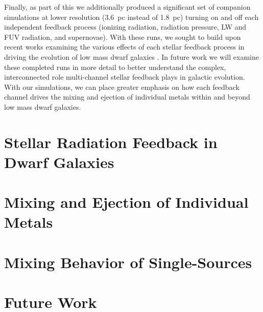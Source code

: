 Finally, as part of this \dissertation we additionally produced a significant set of companion simulations at lower resolution (3.6~pc instead of 1.8~pc) turning on and off each independent feedback process (ionizing radiation, radiation pressure, LW and FUV radiation, and supernovae). With these runs, we sought to build upon recent works examining the various effects of each stellar feedback process in driving the evolution of low mass dwarf galaxies \citep{Hu2016,Hu2017,Hu2018,Forbes2016}. In future work we will examine these completed runs in more detail to better understand the complex, interconnected role multi-channel stellar feedback plays in galactic evolution. With our simulations, we can place greater emphasis on how each feedback channel drives the mixing and ejection of individual metals within and beyond low mass dwarf galaxies.

\section{Stellar Radiation Feedback in Dwarf Galaxies}



\section{Mixing and Ejection of Individual Metals}

\section{Mixing Behavior of Single-Sources}

\section{Future Work}
